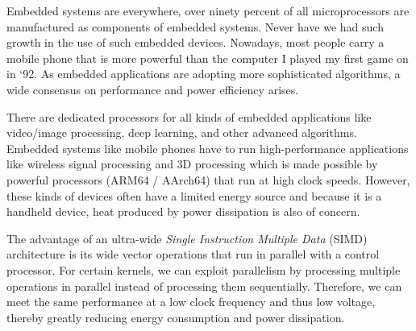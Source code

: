 



Embedded systems are everywhere, over ninety percent of all microprocessors are manufactured as components of embedded systems.
Never have we had such growth in the use of such embedded devices. Nowadays, most people carry a mobile phone that is more powerful than the computer I played my first game on in `92. As embedded applications are adopting more sophisticated algorithms, a wide consensus on performance and power efficiency arises. %

There are dedicated processors for all kinds of embedded applications like video/image processing, deep learning, and other advanced algorithms.
Embedded systems like mobile phones have to run high-performance applications like wireless signal processing and 3D processing \cite{dongrio1} which is made possible by powerful processors (ARM64 / AArch64) that run at high clock speeds. However, these kinds of devices often have a limited energy source and because it is a handheld device, heat produced by power dissipation is also of concern.

The advantage of an ultra-wide \emph{Single Instruction Multiple Data} (SIMD) architecture is its wide vector operations that run in parallel with a control processor. For certain kernels, we can exploit parallelism by processing multiple operations in parallel instead of processing them sequentially. Therefore, we can meet the same performance at a low clock frequency and thus low voltage, thereby greatly reducing energy consumption \cite{dongrio2} and power dissipation.%

